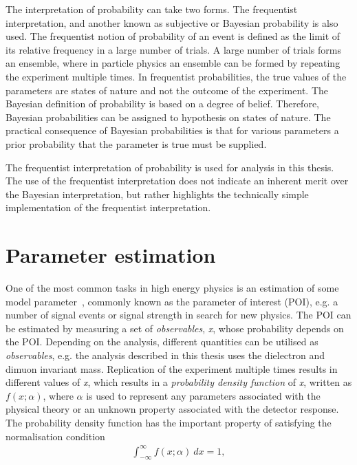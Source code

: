 The interpretation of probability can take two forms. The frequentist interpretation, and another known as subjective or Bayesian probability is also used. The frequentist notion of probability of an event is defined as the limit of its relative frequency in a large number of trials. A large number of trials forms an ensemble, where in particle physics an ensemble can be formed by repeating the experiment multiple times. In frequentist probabilities, the true values of the parameters are states of nature and not the outcome of the experiment. The Bayesian definition of probability is based on a degree of belief. Therefore, Bayesian probabilities can be assigned to hypothesis on states of nature. The practical consequence of Bayesian probabilities is that for various parameters a prior probability that the parameter is true must be supplied. 

The frequentist interpretation of probability is used for analysis in this thesis. The use of the frequentist interpretation does not indicate an inherent merit over the Bayesian interpretation, but rather highlights the technically simple implementation of the frequentist interpretation. 

\section{Parameter estimation}\label{sec:stats:param}
One of the most common tasks in high energy physics is an estimation of some model parameter~\cite{Cowan1998}, commonly known as the parameter of interest (POI), e.g. a number of signal events or signal strength in search for new physics. The POI can be estimated by measuring a set of \emph{observables}, \emph{x}, whose probability depends on the POI. Depending on the analysis, different quantities can be utilised as \emph{observables}, e.g. the analysis described in this thesis uses the dielectron and dimuon invariant mass. Replication of the experiment multiple times results in different values of \emph{x}, which results in a \emph{probability density function} of \emph{x}, written as $f(x;\alpha)$, where $\alpha$ is used to represent any parameters associated with the physical theory or an unknown property associated with the detector response. The probability density function has the important property of satisfying the normalisation condition
\begin{equation}
    \begin{aligned}
        \int_{-\infty}^{\infty} f(x;\alpha)~dx = 1,
    \end{aligned}
\end{equation}

